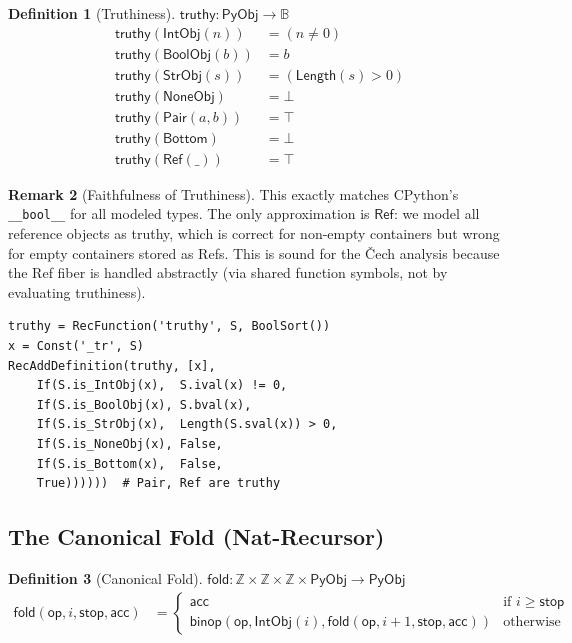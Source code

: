 \documentclass[11pt,a4paper]{report}
\theoremstyle{definition}
\newtheorem{definition}{Definition}[chapter]
\newtheorem{remark}[definition]{Remark}
\theoremstyle{plain}
\newcommand{\Int}{\mathbb{Z}}
\newcommand{\Bool}{\mathbb{B}}
\newcommand{\PyObj}{\mathsf{PyObj}}
\newcommand{\fold}{\mathsf{fold}}
\newcommand{\op}{\mathsf{op}}
\begin{document}
\begin{definition}[Truthiness]
$\mathsf{truthy} : \PyObj \to \Bool$
\begin{align}
  \mathsf{truthy}(\mathsf{IntObj}(n)) &= (n \neq 0) \\
  \mathsf{truthy}(\mathsf{BoolObj}(b)) &= b \\
  \mathsf{truthy}(\mathsf{StrObj}(s)) &= (\mathsf{Length}(s) > 0) \\
  \mathsf{truthy}(\mathsf{NoneObj}) &= \bot \\
  \mathsf{truthy}(\mathsf{Pair}(a, b)) &= \top \\
  \mathsf{truthy}(\mathsf{Bottom}) &= \bot \\
  \mathsf{truthy}(\mathsf{Ref}(\_)) &= \top
\end{align}
\end{definition}

\begin{remark}[Faithfulness of Truthiness]
This exactly matches CPython's \texttt{\_\_bool\_\_} for all modeled
types.  The only approximation is $\mathsf{Ref}$: we model all
reference objects as truthy, which is correct for non-empty containers
but wrong for empty containers stored as Refs.  This is sound for
the \v{C}ech analysis because the Ref fiber is handled abstractly
(via shared function symbols, not by evaluating truthiness).
\end{remark}

\begin{lstlisting}[caption={truthy: complete Z3 implementation}]
truthy = RecFunction('truthy', S, BoolSort())
x = Const('_tr', S)
RecAddDefinition(truthy, [x],
    If(S.is_IntObj(x),  S.ival(x) != 0,
    If(S.is_BoolObj(x), S.bval(x),
    If(S.is_StrObj(x),  Length(S.sval(x)) > 0,
    If(S.is_NoneObj(x), False,
    If(S.is_Bottom(x),  False,
    True))))))  # Pair, Ref are truthy
\end{lstlisting}

\subsection{The Canonical Fold (Nat-Recursor)}

\begin{definition}[Canonical Fold]
$\fold : \Int \times \Int \times \Int \times \PyObj \to \PyObj$
\begin{align}
  \fold(\op, i, \mathsf{stop}, \mathsf{acc}) &= \begin{cases}
    \mathsf{acc} & \text{if } i \geq \mathsf{stop} \\
    \mathsf{binop}(\op, \mathsf{IntObj}(i),
      \fold(\op, i+1, \mathsf{stop}, \mathsf{acc}))
      & \text{otherwise}
  \end{cases}
\end{align}
\end{definition}
\end{document}
